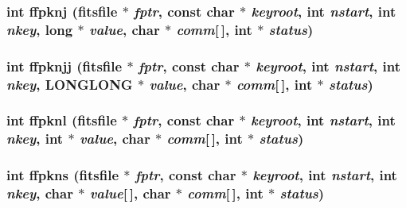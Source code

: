\subsubsection{\setlength{\rightskip}{0pt plus 5cm}int ffpknj (\bf{fitsfile} $\ast$ {\em fptr}, const char $\ast$ {\em keyroot}, int {\em nstart}, int {\em nkey}, long $\ast$ {\em value}, char $\ast$ {\em comm}[$\,$], int $\ast$ {\em status})}\label{test_2roimasker_2fitsio_8h_8d79acce0d2b0239c334aceede23c738}


\subsubsection{\setlength{\rightskip}{0pt plus 5cm}int ffpknjj (\bf{fitsfile} $\ast$ {\em fptr}, const char $\ast$ {\em keyroot}, int {\em nstart}, int {\em nkey}, \bf{LONGLONG} $\ast$ {\em value}, char $\ast$ {\em comm}[$\,$], int $\ast$ {\em status})}\label{test_2roimasker_2fitsio_8h_c2b99d9ff15c6f48a24d280e0db042f0}


\subsubsection{\setlength{\rightskip}{0pt plus 5cm}int ffpknl (\bf{fitsfile} $\ast$ {\em fptr}, const char $\ast$ {\em keyroot}, int {\em nstart}, int {\em nkey}, int $\ast$ {\em value}, char $\ast$ {\em comm}[$\,$], int $\ast$ {\em status})}\label{test_2roimasker_2fitsio_8h_5ee226d4cad1422b59808f83662bdd0a}


\subsubsection{\setlength{\rightskip}{0pt plus 5cm}int ffpkns (\bf{fitsfile} $\ast$ {\em fptr}, const char $\ast$ {\em keyroot}, int {\em nstart}, int {\em nkey}, char $\ast$ {\em value}[$\,$], char $\ast$ {\em comm}[$\,$], int $\ast$ {\em status})}\label{test_2roimasker_2fitsio_8h_4cc9952d07023a429d09abe9fb29f654}


